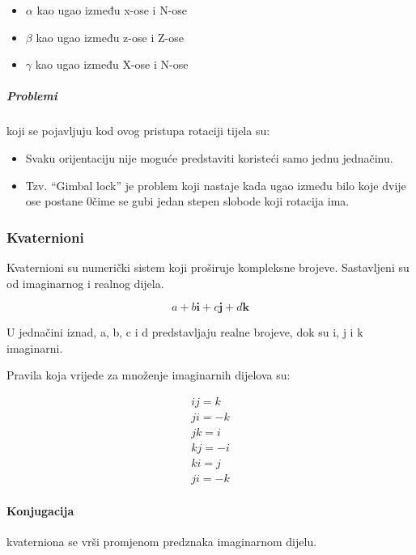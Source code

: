 \documentclass[../Document.tex]{subfiles}
\begin{document}
\begin{itemize}
    \item $\alpha$ kao ugao između x-ose i N-ose
    \item $\beta$ kao ugao između z-ose i Z-ose
    \item $\gamma$ kao ugao između X-ose i N-ose
\end{itemize}


\subparagraph{Problemi} koji se pojavljuju kod ovog pristupa rotaciji tijela su:

\begin{itemize}
    \item Svaku orijentaciju nije moguće predstaviti koristeći samo jednu jednačinu.
    \item Tzv. ``Gimbal lock'' je problem koji nastaje kada ugao između bilo koje dvije ose postane 0\textdegree čime se gubi jedan stepen slobode koji rotacija ima.
\end{itemize}

\subsubsection{Kvaternioni}
Kvaternioni su numerički sistem koji proširuje kompleksne brojeve. Sastavljeni su od imaginarnog i realnog dijela.

$$
    a+b\mathbf{i}+c\mathbf{j}+d\mathbf{k}
$$

\noindent U jednačini iznad, a, b, c i d predstavljaju realne brojeve, dok su i, j i k imaginarni.

\noindent Pravila koja vrijede za množenje imaginarnih dijelova su:

\begin{align*}
    ij=k  \\
    ji=-k \\
    jk=i  \\
    kj=-i \\
    ki=j  \\
    ji=-k
\end{align*}


\paragraph{Konjugacija}
kvaterniona se vrši promjenom predznaka imaginarnom dijelu.
\end{document}
